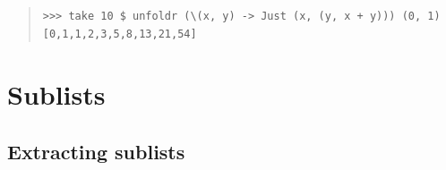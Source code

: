 \begin{haddockdesc}
{\begin{quote}
{\begin{verbatim}
\end{verbatim}}
\end{quote}
\begin{quote}
{\haddockverb\begin{verbatim}
>>> take 10 $ unfoldr (\(x, y) -> Just (x, (y, x + y))) (0, 1)
[0,1,1,2,3,5,8,13,21,54]

\end{verbatim}}
\end{quote}}
\end{haddockdesc}
\section{Sublists}
\subsection{Extracting sublists}
